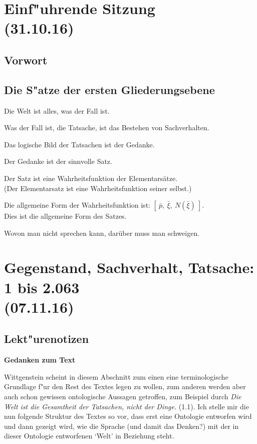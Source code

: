 \documentclass[]{scrartcl}
\begin{document}
\section{Einf"uhrende Sitzung\\(31.10.16)}

\subsection{Vorwort}


\subsection{Die S"atze der ersten Gliederungsebene}
\begin{description}[leftmargin=!,labelwidth=\widthof{\bfseries 12}]
  \item[1] Die Welt ist alles, was der Fall ist.
  \item[2] Was der Fall ist, die Tatsache, ist das Bestehen von Sachverhalten.
  \item[3] Das logische Bild der Tatsachen ist der Gedanke.
  \item[4] Der Gedanke ist der sinnvolle Satz.
  \item[5] Der Satz ist eine Wahrheitsfunktion der Elementarsätze.\\
(Der Elementarsatz ist eine Wahrheitsfunktion seiner selbst.)
  \item[6] Die allgemeine Form der Wahrheitsfunktion ist: $[~\bar{p},~\bar{\xi},~N(\bar{\xi})~]$.\\
Dies ist die allgemeine Form des Satzes.
  \item[7] Wovon man nicht sprechen kann, darüber muss man schweigen.
\end{description}

\section{Gegenstand, Sachverhalt, Tatsache: 1 bis 2.063\\(07.11.16)}
\subsection{Lekt"urenotizen}
\textbf{Gedanken zum Text}

Wittgenstein scheint in diesem Abschnitt zum einen eine terminologische Grundlage f"ur den Rest des Textes legen zu wollen, zum anderen werden aber auch schon gewissen ontologische Aussagen getroffen, zum Beispiel durch \emph{Die Welt ist die Gesamtheit der Tatsachen, nicht der Dinge.} (1.1). Ich stelle mir die nun folgende Struktur des Textes so vor, dass erst eine Ontologie entworfen wird und dann gezeigt wird, wie die Sprache (und damit das Denken?) mit der in dieser Ontologie entworfenen `Welt' in Beziehung steht. 
\end{document}
